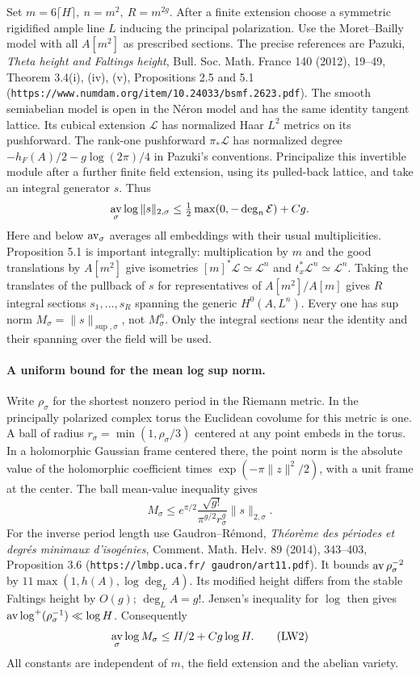 Set \(m=6\lceil H\rceil,\ n=m^2,\ R=m^{2g}\). After a finite
extension choose a symmetric rigidified ample line \(L\) inducing
the principal polarization. Use the Moret--Bailly model with all
\(A[m^2]\) as prescribed sections. The precise references are
Pazuki, \emph{Theta height and Faltings height}, Bull. Soc. Math.
France 140 (2012), 19--49, Theorem 3.4(i), (iv), (v),
Propositions 2.5 and 5.1
(\texttt{https://www.numdam.org/item/10.24033/bsmf.2623.pdf}).
The smooth semiabelian model is open in the N\'eron model and
has the same identity tangent lattice. Its cubical extension
\(\mathcal L\) has normalized Haar \(L^2\) metrics on its pushforward.
The rank-one pushforward \(\pi_*\mathcal L\) has normalized degree
\(-h_F(A)/2-g\log(2\pi)/4\) in Pazuki's conventions.
Principalize this invertible module after a further finite field
extension, using its pulled-back lattice, and take an integral
generator \(s\). Thus
\[
 \mathop{\rm av}_{\sigma}\log\|s\|_{2,\sigma}
             \le \tfrac12\max(0,-\deg_n\mathcal E)+C g .
\]
Here and below \(\mathop{\rm av}_{\sigma}\) averages all embeddings
with their usual multiplicities. Proposition 5.1 is important
integrally: multiplication by \(m\) and the good translations by
\(A[m^2]\) give isometries
\([m]^*\mathcal L\simeq\mathcal L^n\) and
\(t_x^*\mathcal L^n\simeq\mathcal L^n\).
Taking the translates of the pullback of \(s\) for representatives
of \(A[m^2]/A[m]\) gives \(R\) integral sections \(s_1,\ldots,s_R\)
spanning the generic \(H^0(A,L^n)\). Every one has sup norm
\(M_\sigma=\|s\|_{\sup,\sigma}\), not \(M_\sigma^n\).
Only the integral sections near the identity and their spanning
over the field will be used.

\paragraph{A uniform bound for the mean log sup norm.}
Write \(\rho_\sigma\) for the shortest nonzero period in the
Riemann metric. In the principally polarized complex torus the
Euclidean covolume for this metric is one. A ball of radius
\(r_\sigma=\min(1,\rho_\sigma/3)\) centered at any point embeds
in the torus. In a holomorphic Gaussian frame centered there,
the point norm is the absolute value of the holomorphic
coefficient times \(\exp(-\pi\|z\|^2/2)\), with a unit frame
at the center. The ball mean-value inequality gives
\[
 M_\sigma\le e^{\pi/2}
       \frac{\sqrt{g!}}{\pi^{g/2}r_\sigma^g}\|s\|_{2,\sigma}.
\]
For the inverse period length use Gaudron--R\'emond,
\emph{Th\'eor\`eme des p\'eriodes et degr\'es minimaux
d'isog\'enies}, Comment. Math. Helv. 89 (2014), 343--403,
Proposition 3.6
(\texttt{https://lmbp.uca.fr/\string~gaudron/art11.pdf}).
It bounds \(\mathop{\rm av}\rho_\sigma^{-2}\) by
\(11\max(1,h(A),\log\deg_L A)\). Its modified height differs
from the stable Faltings height by \(O(g)\);
\(\deg_L A=g!\). Jensen's inequality for \(\log\) then gives
\(\mathop{\rm av}\log^+(\rho_\sigma^{-1})\ll\log H\).
Consequently
\[
 \mathop{\rm av}_{\sigma}\log M_\sigma
                \le H/2+C g\log H.                    \tag{LW2}
\]
All constants are independent of \(m\), the field extension and the
abelian variety.

